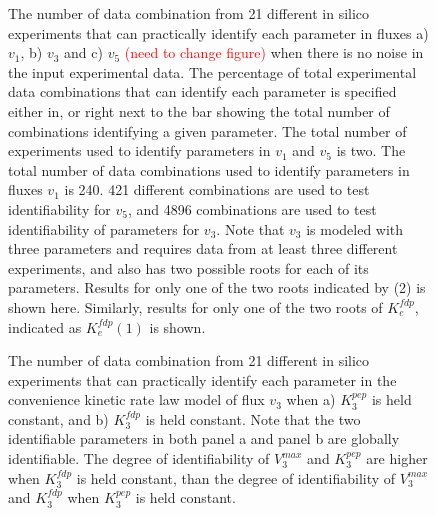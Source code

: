 \documentclass[10pt]{article}
\begin{document}
\begin{figure}[!tbhp]
		\caption{The number of data combination from 21 different in silico experiments that can practically identify each parameter in fluxes a) $v_1$, b) $v_3$ and c) $v_5$ \textcolor{red}{(need to change figure)} when there is no noise in the input experimental data. The percentage of total experimental data combinations that can identify each parameter is specified either in, or right next to the bar showing the total number of combinations identifying a given parameter. The total number of experiments used to identify parameters in $v_1$ and $v_5$ is two. The total number of data combinations used to identify parameters in fluxes $v_1$ is 240. 421 different combinations are used to test identifiability for $v_5$, and 4896 combinations are used to test identifiability of parameters for $v_3$. Note that $v_3$ is modeled with three parameters and requires data from at least three different experiments, and also has two possible roots for each of its parameters. Results for only one of the two roots indicated by (2) is shown here. Similarly, results for only one of the two roots of $K_e^{fdp}$, indicated as $K_e^{fdp}(1)$ is shown.}\label{fig:ident_root2}
	\end{figure}

	\begin{figure}[!tbhp]
		\caption{The number of data combination from 21 different in silico experiments that can practically identify each parameter in the convenience kinetic rate law model of flux $v_3$ when a) $K_3^{pep}$ is held constant, and b) $K_3^{fdp}$ is held constant. Note that the two identifiable parameters in both panel a and panel b are globally identifiable. The degree of identifiability of $V_3^{max}$ and $K_3^{pep}$ are higher when $K_3^{fdp}$ is held constant, than the degree of identifiability of $V_3^{max}$ and $K_3^{fdp}$ when $K_3^{pep}$ is held constant.}\label{fig:ident_v3_var}
	\end{figure} 
\end{document}

